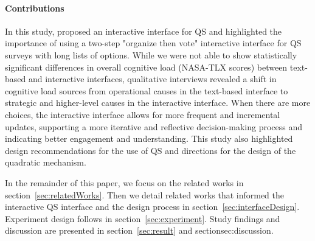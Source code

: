 \paragraph{Contributions}
In this study, proposed an interactive interface for QS and highlighted the importance of using a two-step "organize then vote" interactive interface for QS surveys with long lists of options. While we were not able to show statistically significant differences in overall cognitive load (NASA-TLX scores) between text-based and interactive interfaces, qualitative interviews revealed a shift in cognitive load sources from operational causes in the text-based interface to strategic and higher-level causes in the interactive interface. When there are more choices, the interactive interface allows for more frequent and incremental updates, supporting a more iterative and reflective decision-making process and indicating better engagement and understanding. This study also highlighted design recommendations for the use of QS and directions for the design of the quadratic mechanism.

In the remainder of this paper, we focus on the related works in section~\ref{sec:relatedWorks}. Then we detail related works that informed the interactive QS interface and the design process in section~\ref{sec:interfaceDesign}. Experiment design follows in section~\ref{sec:experiment}. Study findings and discussion are presented in section~\ref{sec:result} and section{sec:discussion}.


